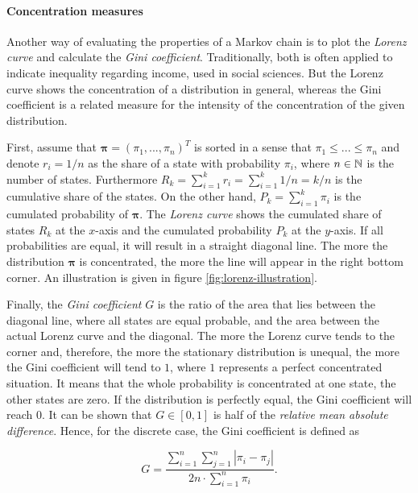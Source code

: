 \paragraph{Concentration measures}

Another way of evaluating the properties of a Markov chain is to plot the \emph{Lorenz curve} and calculate the \emph{Gini coefficient}. Traditionally, both is often applied to indicate inequality regarding income, used in social sciences. But the Lorenz curve shows the concentration of a distribution in general, whereas the Gini coefficient is a related measure for the intensity of the concentration of the given distribution.

First, assume that $\bm\pi = (\pi_1, ..., \pi_n)^T$ is sorted in a sense that $\pi_1 \le ... \le \pi_n$ and denote $r_i = 1/n$ as the share of a state with probability $\pi_i$, where $n\in\mathbb{N}$ is the number of states. Furthermore $R_k = \sum_{i=1}^k r_i = \sum_{i=1}^k 1/n = k/n$ is the cumulative share of the states. On the other hand, $P_k = \sum_{i=1}^k \pi_i$ is the cumulated probability of $\bm\pi$. The \emph{Lorenz curve} shows the cumulated share of states $R_k$ at the $x$-axis and the cumulated probability $P_k$ at the $y$-axis. If all probabilities are equal, it will result in a straight diagonal line. The more the distribution $\bm\pi$ is concentrated, the more the line will appear in the right bottom corner. An illustration is given in figure \ref{fig:lorenz-illustration}.

Finally, the \emph{Gini coefficient} $G$ is the ratio of the area that lies between the diagonal line, where all states are equal probable, and the area between the actual Lorenz curve and the diagonal. The more the Lorenz curve tends to the corner and, therefore, the more the stationary distribution is unequal, the more the Gini coefficient will tend to $1$, where $1$ represents a perfect concentrated situation. It means that the whole probability is concentrated at one state, the other states are zero. If the distribution is perfectly equal, the Gini coefficient will reach $0$. It can be shown that $G \in [0,1]$ is half of the \emph{relative mean absolute difference}. Hence, for the discrete case, the Gini coefficient is defined as

\begin{equation}
\label{eq:gini}
G = \frac{\sum_{i=1}^n \sum_{j=1}^n |\pi_i - \pi_j|}{2n\cdot \sum_{i=1}^n \pi_i}.
\end{equation}

